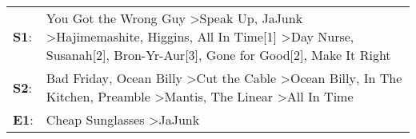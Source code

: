 \begin{supertabular}{p{0.03\textwidth}p{0.92\textwidth}}
 \textbf{S1}:  &  You Got the Wrong Guy\textsuperscript{} \textgreater \enspace Speak Up\textsuperscript{}, \enspace JaJunk\textsuperscript{} \textgreater \enspace Hajimemashite\textsuperscript{}, \enspace Higgins\textsuperscript{}, \enspace All In Time[1]\textsuperscript{} \textgreater \enspace Day Nurse\textsuperscript{}, \enspace Susanah[2]\textsuperscript{}, \enspace Bron-Yr-Aur[3]\textsuperscript{}, \enspace Gone for Good[2]\textsuperscript{}, \enspace Make It Right\textsuperscript{}  \enspace  \\
 \textbf{S2}:  &                                                                                     Bad Friday\textsuperscript{}, \enspace Ocean Billy\textsuperscript{} \textgreater \enspace Cut the Cable\textsuperscript{} \textgreater \enspace Ocean Billy\textsuperscript{}, \enspace In The Kitchen\textsuperscript{}, \enspace Preamble\textsuperscript{} \textgreater \enspace Mantis\textsuperscript{}, \enspace The Linear\textsuperscript{} \textgreater \enspace All In Time\textsuperscript{}  \enspace  \\
 \textbf{E1}:  &                                                                                                                                                                                                                                                                                                                                                                                                            Cheap Sunglasses\textsuperscript{} \textgreater \enspace JaJunk\textsuperscript{}  \enspace  \\
\end{supertabular}
